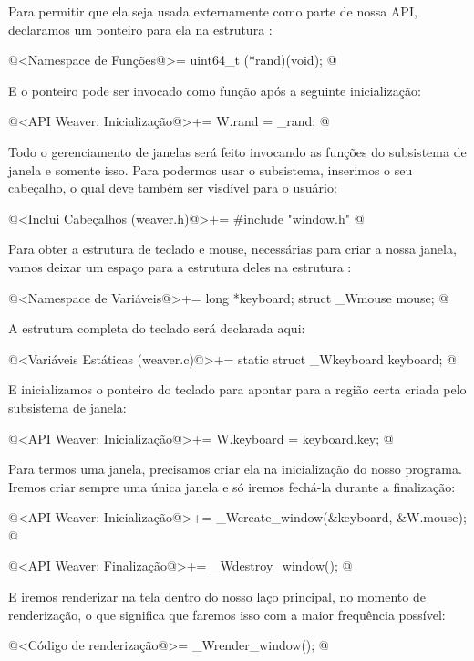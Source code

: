 Para permitir que ela seja usada externamente como parte de nossa API,
declaramos um ponteiro para ela na estrutura :

\iniciocodigo
@<Namespace de Funções@>=
uint64_t (*rand)(void);
@
\fimcodigo

E o ponteiro pode ser invocado como função após a seguinte
inicialização:

\iniciocodigo
@<API Weaver: Inicialização@>+=
W.rand = _rand;
@
\fimcodigo


Todo o gerenciamento de janelas será feito invocando as funções do
subsistema de janela e somente isso. Para podermos usar o subsistema,
inserimos o seu cabeçalho, o qual deve também ser visdível para o
usuário:

\iniciocodigo
@<Inclui Cabeçalhos (weaver.h)@>+=
#include "window.h"
@
\fimcodigo

Para obter a estrutura de teclado e mouse, necessárias para criar a
nossa janela, vamos deixar um espaço para a estrutura deles na
estrutura :

\iniciocodigo
@<Namespace de Variáveis@>+=
long *keyboard;
struct _Wmouse mouse;
@
\fimcodigo

A estrutura completa do teclado será declarada aqui:

\iniciocodigo
@<Variáveis Estáticas (weaver.c)@>+=
static struct _Wkeyboard keyboard;
@
\fimcodigo

E inicializamos o ponteiro do teclado para apontar para a região certa
criada pelo subsistema de janela:

\iniciocodigo
@<API Weaver: Inicialização@>+=
W.keyboard = keyboard.key;
@
\fimcodigo

Para termos uma janela, precisamos criar ela na inicialização do nosso
programa. Iremos criar sempre uma única janela e só iremos fechá-la
durante a finalização:

\iniciocodigo
@<API Weaver: Inicialização@>+=
_Wcreate_window(&keyboard, &W.mouse);
@
\fimcodigo

\iniciocodigo
@<API Weaver: Finalização@>+=
_Wdestroy_window();
@
\fimcodigo

E iremos renderizar na tela dentro do nosso laço principal, no momento
de renderização, o que significa que faremos isso com a maior
frequência possível:

\iniciocodigo
@<Código de renderização@>=
_Wrender_window();
@
\fimcodigo


